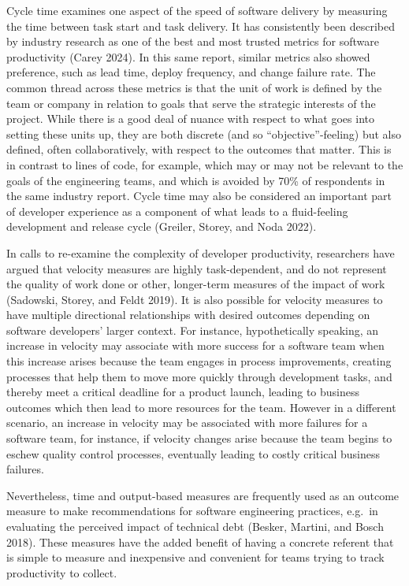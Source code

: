 \documentclass[
]{article}
\begin{document}
Cycle time examines one aspect of the speed of software delivery by
measuring the time between task start and task delivery. It has
consistently been described by industry research as one of the best and
most trusted metrics for software productivity (Carey 2024). In this
same report, similar metrics also showed preference, such as lead time,
deploy frequency, and change failure rate. The common thread across
these metrics is that the unit of work is defined by the team or company
in relation to goals that serve the strategic interests of the project.
While there is a good deal of nuance with respect to what goes into
setting these units up, they are both discrete (and so
``objective''-feeling) but also defined, often collaboratively, with
respect to the outcomes that matter. This is in contrast to lines of
code, for example, which may or may not be relevant to the goals of the
engineering teams, and which is avoided by 70\% of respondents in the
same industry report. Cycle time may also be considered an important
part of developer experience as a component of what leads to a
fluid-feeling development and release cycle (Greiler, Storey, and Noda
2022).

In calls to re-examine the complexity of developer productivity,
researchers have argued that velocity measures are highly
task-dependent, and do not represent the quality of work done or other,
longer-term measures of the impact of work (Sadowski, Storey, and Feldt
2019). It is also possible for velocity measures to have multiple
directional relationships with desired outcomes depending on software
developers' larger context. For instance, hypothetically speaking, an
increase in velocity may associate with more success for a software team
when this increase arises because the team engages in process
improvements, creating processes that help them to move more quickly
through development tasks, and thereby meet a critical deadline for a
product launch, leading to business outcomes which then lead to more
resources for the team. However in a different scenario, an increase in
velocity may be associated with more failures for a software team, for
instance, if velocity changes arise because the team begins to eschew
quality control processes, eventually leading to costly critical
business failures.

Nevertheless, time and output-based measures are frequently used as an
outcome measure to make recommendations for software engineering
practices, e.g.~in evaluating the perceived impact of technical debt
(Besker, Martini, and Bosch 2018). These measures have the added benefit
of having a concrete referent that is simple to measure and inexpensive
and convenient for teams trying to track productivity to collect.
\end{document}
